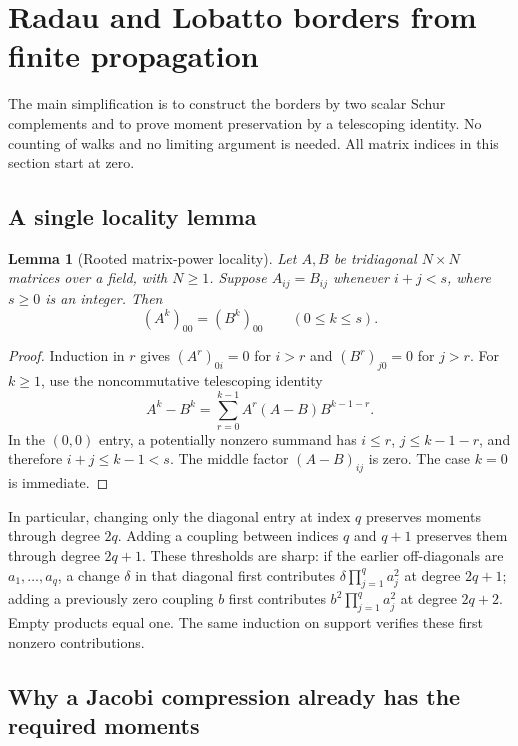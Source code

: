 \documentclass[11pt,a4paper]{article}
\newtheorem{lemma}[theorem]{Lemma}
\theoremstyle{definition}
\begin{document}
\section{Radau and Lobatto borders from finite propagation}
\label{focused:borders}

The main simplification is to construct the borders by two scalar Schur
complements and to prove moment preservation by a telescoping identity.
No counting of walks and no limiting argument is needed.
All matrix indices in this section start at zero.

\subsection{A single locality lemma}

\begin{lemma}[Rooted matrix-power locality]
Let $A,B$ be tridiagonal $N\times N$ matrices over a field, with $N\ge1$.
Suppose $A_{ij}=B_{ij}$ whenever $i+j<s$, where $s\ge0$ is an integer.
Then
\[
 (A^k)_{00}=(B^k)_{00}\qquad(0\le k\le s).
 \tag{BL1}
\]
\end{lemma}
\begin{proof}
Induction in $r$ gives
$(A^r)_{0i}=0$ for $i>r$ and $(B^r)_{j0}=0$ for $j>r$.
For $k\ge1$, use the noncommutative telescoping identity
\[
 A^k-B^k=\sum_{r=0}^{k-1}A^r(A-B)B^{k-1-r}.
\]
In the $(0,0)$ entry, a potentially nonzero summand has
$i\le r$, $j\le k-1-r$, and therefore $i+j\le k-1<s$.
The middle factor $(A-B)_{ij}$ is zero. The case $k=0$ is immediate.
\end{proof}

In particular, changing only the diagonal entry at index $q$ preserves
moments through degree $2q$. Adding a coupling between indices $q$ and
$q+1$ preserves them through degree $2q+1$. These thresholds are sharp:
if the earlier off-diagonals are $a_1,\ldots,a_q$, a change $\delta$ in
that diagonal first contributes
$\delta\prod_{j=1}^q a_j^2$ at degree $2q+1$; adding a previously zero
coupling $b$ first contributes $b^2\prod_{j=1}^q a_j^2$ at degree $2q+2$.
Empty products equal one. The same induction on support verifies these
first nonzero contributions.

\subsection{Why a Jacobi compression already has the required moments}
\end{document}
